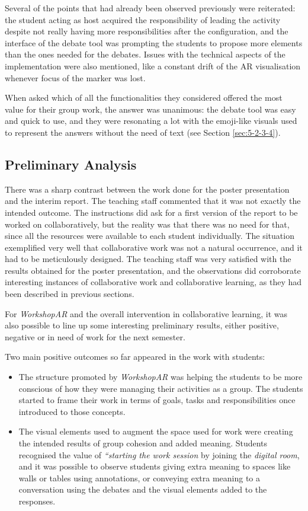 Several of the points that had already been observed previously were reiterated: the student acting as host acquired the responsibility of leading the activity despite not
really having more responsibilities after the configuration, and the interface of the debate tool was prompting the students to propose more elements than the ones needed
for the debates. Issues with the technical aspects of the implementation were also mentioned, like a constant drift of the \ac{AR} visualisation whenever focus of the
marker was lost.

When asked which of all the functionalities they considered offered the most value for their group work, the answer was unanimous: the debate tool was easy and quick to
use, and they were resonating a lot with the emoji-like visuals used to represent the answers without the need of text (see Section \ref{sec:5-2-3-4}).

\subsection{Preliminary Analysis \label{sec:6-6-3}}

There was a sharp contrast between the work done for the poster presentation and the interim report. The teaching staff commented that it was not exactly the intended
outcome. The instructions did ask for a first version of the report to be worked on collaboratively, but the reality was that there was no need for that, since all the
resources were available to each student individually. The situation exemplified very well that collaborative work was not a natural occurrence, and it had to be
meticulously designed. The teaching staff was very satisfied with the results obtained for the poster presentation, and the observations did corroborate interesting
instances of collaborative work and collaborative learning, as they had been described in previous sections.

For \emph{WorkshopAR} and the overall intervention in collaborative learning, it was also possible to line up some interesting preliminary results, either positive,
negative or in need of work for the next semester.

Two main positive outcomes so far appeared in the work with students:

\begin{itemize}
    \item The structure promoted by \emph{WorkshopAR} was helping the students to be more conscious of how they were managing their activities as a group. The students 
    started to frame their work in terms of goals, tasks and responsibilities once introduced to those concepts.
    \item The visual elements used to augment the space used for work were creating the intended results of group cohesion and added meaning. Students recognised the value
    of \emph{“starting the work session} by joining the \emph{digital room}, and it was possible to observe students giving extra meaning to spaces like walls or tables
    using annotations, or conveying extra meaning to a conversation using the debates and the visual elements added to the responses. 
\end{itemize}

